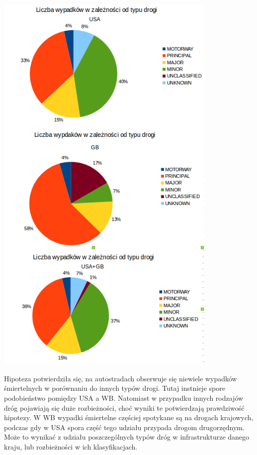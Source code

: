 \includegraphics[width=0.8\textwidth]{images/statistics/road_type.png}

Hipoteza potwierdziła się, na autostradach obserwuje się niewiele
wypadków śmiertelnych w porównaniu do innych typów drogi. Tutaj
instnieje spore podobieństwo pomiędzy USA a WB. Natomiast w przypadku
innych rodzajów dróg pojawiają się duże rozbieżności, choć wyniki te
potwierdzają prawdziwość hipotezy. W WB wypadki śmiertelne częściej
spotykane są na drogach krajowych, podczas gdy w USA spora część tego
udziału przypada drogom drugorzędnym. Może to wynikać z udziału
poszczególnych typów dróg w infrastrukturze danego kraju, lub
rozbieżności w ich klasyfikacjach.
